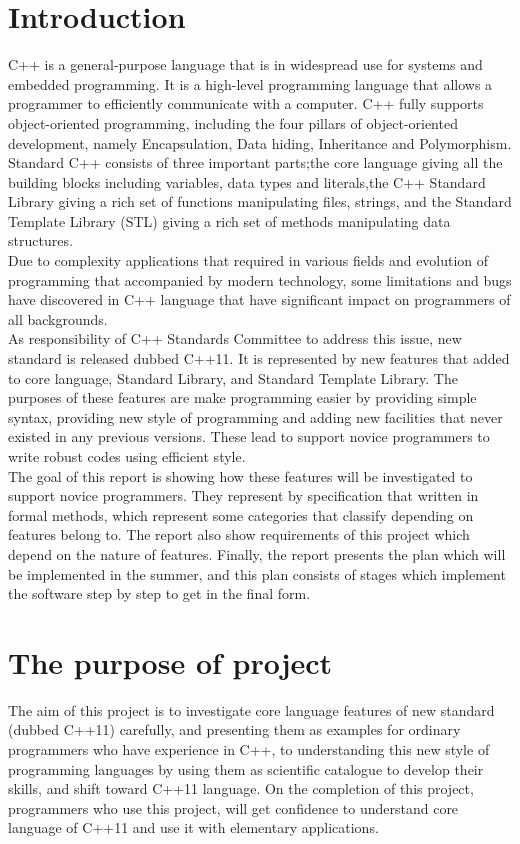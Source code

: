 \documentclass[12pt,a4paper]{report}
\begin{document}
\section{Introduction}  
\label{section: intorduction}
C++ is a general-purpose language that is in widespread use for systems and embedded programming. It is a high-level programming language that allows a programmer to efficiently communicate with a computer. C++ fully supports object-oriented programming, including the four pillars of object-oriented development, namely Encapsulation, Data hiding, Inheritance and Polymorphism.\\
Standard C++ consists of three important parts;the core language giving all the building blocks including variables, data types and literals,the C++ Standard Library giving a rich set of functions manipulating files, strings, and the Standard Template Library (STL) giving a rich set of methods manipulating data structures.\\
Due to complexity applications  that required in various fields and evolution of programming that  accompanied by modern technology, some limitations and bugs have discovered in C++ language that have significant impact on programmers of all backgrounds.\\
As responsibility of C++ Standards Committee to address this issue, new standard is released dubbed C++11. It is represented by new features that added to core language, Standard  Library, and Standard Template Library. The purposes of these features are make programming easier by providing simple syntax, providing new style of programming and adding new facilities that never existed in any previous versions. These lead to support novice programmers to write robust codes using efficient style.\\
The goal of this report is showing how these features will be investigated to support novice programmers. They represent by specification that written in formal methods, which represent some categories that  classify depending on features belong to. The report also show requirements of this project which depend on the nature of features. Finally, the report presents the plan which will be implemented in the summer, and this plan consists of stages which implement the software step by step to get in the final form.
\newpage


\section{The purpose of project}
\label{section:The purpose of project}
The aim of this project is to investigate core language  features of new standard (dubbed C++11) carefully, and presenting them as examples for ordinary programmers who have experience in C++, to understanding this new style of programming languages by using them as scientific  catalogue to develop their skills, and shift toward C++11 language.
\newline
On the completion of this project, programmers who use this project, will get confidence to understand core language of  C++11 and use it with elementary applications.
\end{document}
